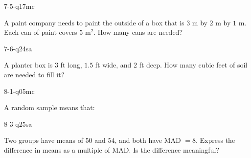 \begin{practiceQuestion}{7-5-q17}{mc}
\begin{questionText}
A paint company needs to paint the outside of a box that is $3$ m by $2$ m by $1$ m. Each can of paint covers $5$ m$^2$. How many cans are needed?
\end{questionText}
\end{practiceQuestion}

\begin{practiceQuestion}{7-6-q24}{sa}
\begin{questionText}
A planter box is $3$ ft long, $1.5$ ft wide, and $2$ ft deep. How many cubic feet of soil are needed to fill it?
\end{questionText}
\end{practiceQuestion}

\begin{practiceQuestion}{8-1-q05}{mc}
\begin{questionText}
A random sample means that:
\end{questionText}
\end{practiceQuestion}

\begin{practiceQuestion}{8-3-q25}{sa}
\begin{questionText}
Two groups have means of $50$ and $54$, and both have MAD $= 8$. Express the difference in means as a multiple of MAD. Is the difference meaningful?
\end{questionText}
\end{practiceQuestion}

